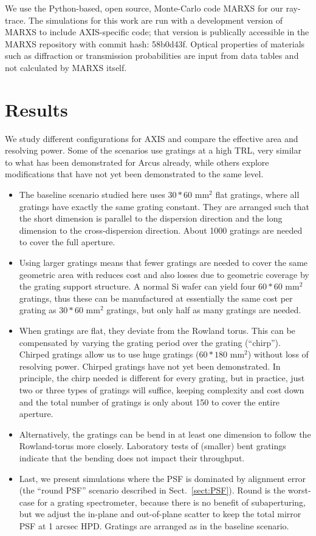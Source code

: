 \documentclass[12pt]{spieman}  %
\begin{document}
\begin{spacing}{1}
We use the Python-based, open source, Monte-Carlo code MARXS for our ray-trace\cite{marxs1.1,2017AJ....154..243G}. The simulations for this work are run with a development version of MARXS to include AXIS-specific code; that version is publically accessible in the MARXS repository with commit hash: 58b0d43f. Optical properties of materials such as diffraction or transmission probabilities are input from data tables and not calculated by MARXS itself.


\section{Results}
We study different configurations for AXIS and compare the effective area and resolving power. Some of the scenarios use gratings at a high TRL, very similar to what has been demonstrated for Arcus already, while others explore modifications that have not yet been demonstrated to the same level.

\begin{itemize}
  \item The baseline scenario studied here uses $30 * 60$ mm$^2$ flat gratings, where all gratings have exactly the same grating constant. They are arranged such that the short dimension is parallel to the dispersion direction and the long dimension to the cross-dispersion direction. About 1000 gratings are needed to cover the full aperture.
  \item Using larger gratings means that fewer gratings are needed to cover the same geometric area with reduces cost and also losses due to geometric coverage by the grating support structure. A normal Si wafer can yield four $60 * 60$ mm$^2$ gratings, thus these can be manufactured at essentially the same cost per grating as $30 * 60$ mm$^2$ gratings, but only half as many gratings are needed.
  \item When gratings are flat, they deviate from the Rowland torus. This can be compensated by varying the grating period over the grating (``chirp''). Chirped gratings allow us to use huge gratings ($60 * 180$ mm$^2$) without loss of resolving power. Chirped gratings have not yet been demonstrated. In principle, the chirp needed is different for every grating, but in practice, just two or three types of gratings will suffice\cite{10.1117/12.2562878}, keeping complexity and cost down and the total number of gratings is only about 150 to cover the entire aperture.
  \item Alternatively, the gratings can be bend in at least one dimension to follow the Rowland-torus more closely. Laboratory tests of (smaller) bent gratings indicate that the bending does not impact their throughput\cite{10.1117/12.2274205}.
  \item Last, we present simulations where the PSF is dominated by alignment error (the ``round PSF'' scenario described in Sect.~\ref{sect:PSF}). Round is the worst-case for a grating spectrometer, because there is no benefit of subaperturing, but we adjust the in-plane and out-of-plane scatter to keep the total mirror PSF at 1 arcsec HPD. Gratings are arranged as in the baseline scenario.
\end{itemize}



\end{spacing}
\end{document}
